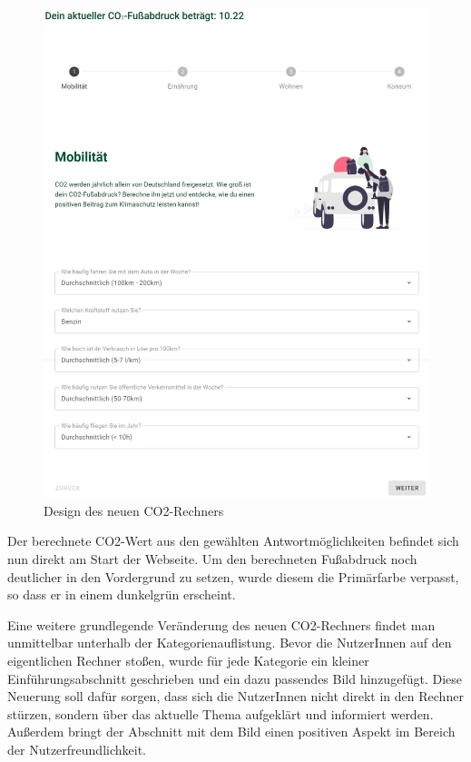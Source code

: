 \begin{figure}[H]
    \centering
    \includegraphics[width=1\textwidth]{images/06/Calculator-New-Design.jpeg}
    \caption{Design des neuen CO2-Rechners}
    \label{fig:new-co2runter-calculator-design}
\end{figure}

Der berechnete CO2-Wert aus den gewählten Antwortmöglichkeiten befindet sich nun direkt am Start der Webseite. Um den berechneten Fußabdruck noch deutlicher in den Vordergrund zu setzen, wurde diesem die Primärfarbe verpasst, so dass er in einem dunkelgrün erscheint.

Eine weitere grundlegende Veränderung des neuen CO2-Rechners findet man unmittelbar unterhalb der Kategorienauflistung. Bevor die NutzerInnen auf den eigentlichen Rechner stoßen, wurde für jede Kategorie ein kleiner Einführungsabschnitt geschrieben und ein dazu passendes Bild hinzugefügt. Diese Neuerung soll dafür sorgen, dass sich die NutzerInnen nicht direkt in den Rechner stürzen, sondern über das aktuelle Thema aufgeklärt und informiert werden. Außerdem bringt der Abschnitt mit dem Bild einen positiven Aspekt im Bereich der Nutzerfreundlichkeit.

